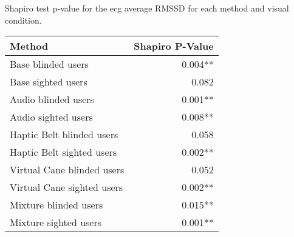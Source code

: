 
\centering
\caption{Shapiro test p-value for the ecg average RMSSD for each method and visual condition.}
\label{tab:shapiro_ecg_rmssd}
\begin{tabular}{lr}
\toprule
                    Method & Shapiro P-Value \\
\midrule
        Base blinded users &         0.004** \\
        Base sighted users &           0.082 \\
       Audio blinded users &         0.001** \\
       Audio sighted users &         0.008** \\
 Haptic Belt blinded users &           0.058 \\
 Haptic Belt sighted users &         0.002** \\
Virtual Cane blinded users &           0.052 \\
Virtual Cane sighted users &         0.002** \\
     Mixture blinded users &         0.015** \\
     Mixture sighted users &         0.001** \\
\bottomrule
\end{tabular}
